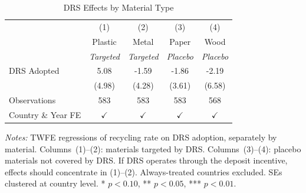 \begin{table}[H]
\centering
\caption{DRS Effects by Material Type}
\label{tab:material}
\begin{threeparttable}
\begin{tabular}{lcccc}
\toprule
 & (1) & (2) & (3) & (4) \\
 & Plastic & Metal & Paper & Wood \\
 & \textit{Targeted} & \textit{Targeted} & \textit{Placebo} & \textit{Placebo} \\
\midrule
DRS Adopted & 5.08 & -1.59 & -1.86 & -2.19 \\
 & (4.98) & (4.28) & (3.61) & (6.58) \\
\midrule
Observations & 583 & 583 & 583 & 568 \\
Country \& Year FE & $\checkmark$ & $\checkmark$ & $\checkmark$ & $\checkmark$ \\
\bottomrule
\end{tabular}
\begin{tablenotes}[flushleft]\small
\item \textit{Notes:} TWFE regressions of recycling rate on DRS adoption, separately by material. Columns~(1)--(2): materials targeted by DRS. Columns~(3)--(4): placebo materials not covered by DRS. If DRS operates through the deposit incentive, effects should concentrate in (1)--(2). Always-treated countries excluded. SEs clustered at country level. * $p<0.10$, ** $p<0.05$, *** $p<0.01$.
\end{tablenotes}
\end{threeparttable}
\end{table}

